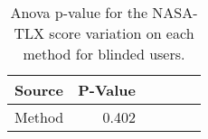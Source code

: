 
\begin{table}[!htb]
\centering
\caption{Anova p-value for the NASA-TLX score variation on each method for blinded users.}
\label{tab:blocanova_nasa_var}
\begin{tabular}{lrrrrr}
\toprule
Source & P-Value \\
\midrule
Method &   0.402 \\
\bottomrule
\end{tabular}
\end{table}

